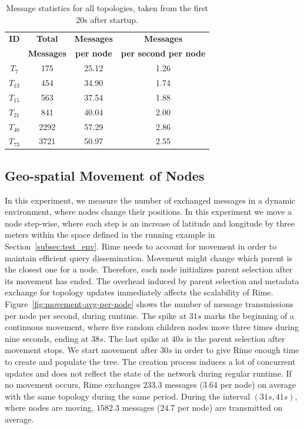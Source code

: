 \begin{table}[t]
  \centering
  \caption{Message statistics for all topologies, taken from the first 20s after startup.}
  \vspace{-3mm}
  \begin{tabular}{| c | c | c | c |}
    \hline
    \textbf{ID} & \textbf{Total} & \textbf{Messages} & \textbf{Messages} \\
     & \textbf{Messages} &  \textbf{per node} &  \textbf{per second per node} \\
    \hline
    $T_{7}$ & 175 & 25.12 & 1.26 \\
    \hline
    $T_{13}$ & 454 & 34.90 & 1.74 \\
    \hline
    $T_{15}$ & 563 & 37.54 & 1.88 \\
    \hline
    $T_{21}$ & 841 & 40.04 & 2.00 \\
    \hline
    $T_{40}$ & 2292 & 57.29 & 2.86 \\
    \hline    
    $T_{73}$ & 3721 & 50.97 & 2.55 \\
    \hline    
  \end{tabular}
\label{tab:total-messages}
\end{table}

\subsection{Geo-spatial Movement of Nodes}\label{sec:evaluation-movement}
In this experiment, we measure the number of exchanged messages in a dynamic environment, where nodes change their positions. In this experiment we move a node step-wise, where each step is an increase of latitude and longitude by three meters within the space defined in the running example in Section~\ref{subsec:test_env}. Rime needs to account for movement in order to maintain efficient query dissemination. Movement might change which parent is the closest one for a node. Therefore, each node initializes parent selection after its movement has ended.
The overhead induced by parent selection and metadata exchange for topology updates immediately affects the scalability of Rime. 
Figure~\ref{fig:movement-avg-per-node} shows the number of message transmissions per node per second, during runtime. 
The spike at $31s$ marks the beginning of a continuous movement, where five random children nodes move three times during nine seconds, ending at $38s$. The last spike at $40s$ is the parent selection after movement stops. We start movement after $30s$ in order to give Rime enough time to create and populate the tree. The creation process induces a lot of concurrent updates and does not reflect the state of the network during regular runtime.
If no movement occurs, Rime exchanges $233.3$ messages ($3.64$ per node) on average with the same topology during the same period. During the interval $(31s,41s)$, where nodes are moving, $1582.3$ messages ($24.7$ per node) are transmitted on average.

